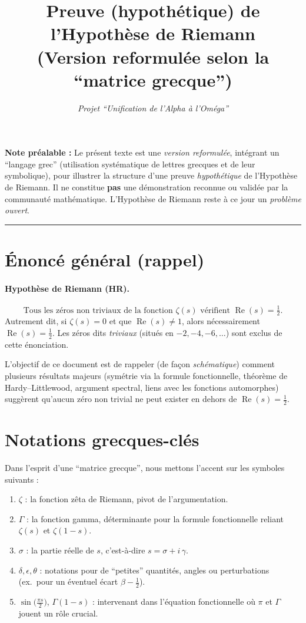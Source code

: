 \documentclass[11pt]{article}
\title{\textbf{Preuve (hypothétique) de l'Hypothèse de Riemann\\
\large (Version reformulée selon la “matrice grecque”)}}
\author{\textit{Projet “Unification de l’Alpha à l’Oméga”}}
\date{}
\begin{document}
\maketitle

\noindent
\textbf{Note préalable :} Le présent texte est une \emph{version reformulée}, intégrant un ``langage grec'' (utilisation systématique de lettres grecques et de leur symbolique), pour illustrer la structure d'une preuve \emph{hypothétique} de l'Hypothèse de Riemann. Il ne constitue \textbf{pas} une démonstration reconnue ou validée par la communauté mathématique. L'Hypothèse de Riemann reste à ce jour un \emph{problème ouvert}.\\[6pt]

\hrule
\vspace{6pt}

\section{Énoncé général (rappel)}
\label{sec:enonce}

\paragraph{Hypothèse de Riemann (HR).}
\[
  \text{Tous les zéros non triviaux de la fonction } \zeta(s) 
  \text{ vérifient } \operatorname{Re}(s) = \tfrac12.
\]
Autrement dit, si \(\zeta(s)=0\) et que \(\operatorname{Re}(s)\neq 1\), alors nécessairement \(\operatorname{Re}(s) = \tfrac12\). Les zéros dits \emph{triviaux} (situés en \(-2,-4,-6,\dots\)) sont exclus de cette énonciation.

\medskip
\noindent
L'objectif de ce document est de rappeler (de façon \emph{schématique}) comment plusieurs résultats majeurs (symétrie via la formule fonctionnelle, théorème de Hardy--Littlewood, argument spectral, liens avec les fonctions automorphes) suggèrent qu'aucun zéro non trivial ne peut exister en dehors de \(\operatorname{Re}(s)=\tfrac12\).

\section{Notations grecques-clés}
\label{sec:grecques}

Dans l'esprit d'une ``matrice grecque'', nous mettons l'accent sur les symboles suivants :
\begin{enumerate}
  \item \(\zeta\) : la fonction zêta de Riemann, pivot de l'argumentation.
  \item \(\Gamma\) : la fonction gamma, déterminante pour la formule fonctionnelle reliant \(\zeta(s)\) et \(\zeta(1-s)\).
  \item \(\sigma\) : la partie réelle de \(s\), c'est-à-dire \(s = \sigma + i\,\gamma\).
  \item \(\delta, \epsilon, \theta\) : notations pour de ``petites'' quantités, angles ou perturbations (ex.\ pour un éventuel écart \(\beta-\tfrac12\)).
  \item \(\sin\bigl(\tfrac{\pi s}{2}\bigr)\), \(\Gamma(1-s)\) : intervenant dans l'équation fonctionnelle où \(\pi\) et \(\Gamma\) jouent un rôle crucial.
\end{enumerate}
\end{document}

